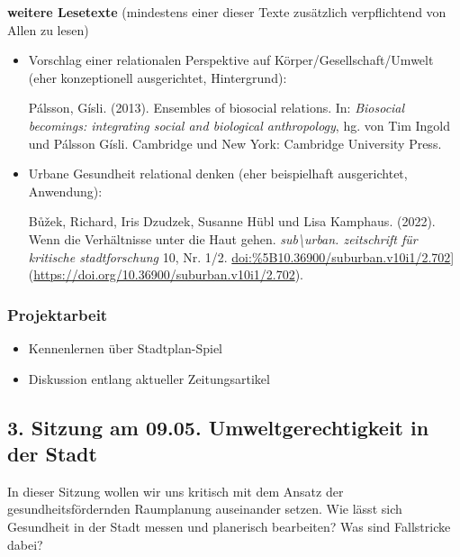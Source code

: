 \documentclass[
  ngerman,
]{article}
\providecommand{\tightlist}{%
  \setlength{\itemsep}{0pt}\setlength{\parskip}{0pt}}
\begin{document}
\textbf{weitere Lesetexte}
(mindestens einer dieser Texte zusätzlich verpflichtend von Allen zu lesen)

\begin{itemize}
\item
  Vorschlag einer relationalen Perspektive auf Körper/Gesellschaft/Umwelt (eher konzeptionell ausgerichtet, Hintergrund):

  Pálsson, Gísli. (2013). Ensembles of biosocial relations. In: \emph{Biosocial becomings: integrating social and biological anthropology}, hg. von Tim Ingold und Pálsson Gísli. Cambridge und New York: Cambridge University Press.
\item
  Urbane Gesundheit relational denken (eher beispielhaft ausgerichtet, Anwendung):

  Bůžek, Richard, Iris Dzudzek, Susanne Hübl und Lisa Kamphaus. (2022). Wenn die Verhältnisse unter die Haut gehen. \emph{sub\textbackslash urban. zeitschrift für kritische stadtforschung} 10, Nr. 1/2. \url{doi:\%5B10.36900/suburban.v10i1/2.702}{]}(\url{https://doi.org/10.36900/suburban.v10i1/2.702}).
\end{itemize}

\hypertarget{projektarbeit}{%
\subsubsection*{Projektarbeit}\label{projektarbeit}}

\begin{itemize}
\tightlist
\item
  Kennenlernen über Stadtplan-Spiel
\item
  Diskussion entlang aktueller Zeitungsartikel
\end{itemize}

\hypertarget{sitzung-am-09.05.-umweltgerechtigkeit-in-der-stadt}{%
\subsection*{3. Sitzung am 09.05. \textbar{} Umweltgerechtigkeit in der Stadt}\label{sitzung-am-09.05.-umweltgerechtigkeit-in-der-stadt}}

In dieser Sitzung wollen wir uns kritisch mit dem Ansatz der gesundheitsfördernden Raumplanung auseinander setzen. Wie lässt sich Gesundheit in der Stadt messen und planerisch bearbeiten? Was sind Fallstricke dabei?
\end{document}
